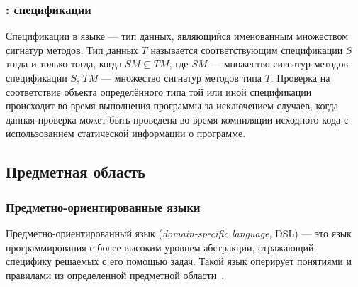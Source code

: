 \subsubsection{: спецификации}
\label{section:accord-specs}
Спецификации в языке  --- тип данных, являющийся именованным
множеством сигнатур методов. Тип данных $T$ называется соответствующим
спецификации $S$ тогда и только тогда, когда
$SM \subseteq TM$, где $SM$ --- множество сигнатур методов спецификации $S$,
$TM$ --- множество сигнатур методов типа $T$. Проверка на соответствие
объекта определённого типа той или иной спецификации происходит во время
выполнения программы за исключением случаев, когда данная проверка может
быть проведена во время компиляции исходного кода с использованием
статической информации о программе.

\subsection{Предметная область}
\subsubsection{Предметно-ориентированные языки}
\label{dsl-section}
Предметно-ориентированный язык (\textit{domain-specific language}, DSL) ---
это язык программирования с более высоким уровнем абстракции,
отражающий специфику решаемых с его помощью задач. Такой язык оперирует
понятиями и правилами из определенной предметной области~\cite{book-of-dsls}.

